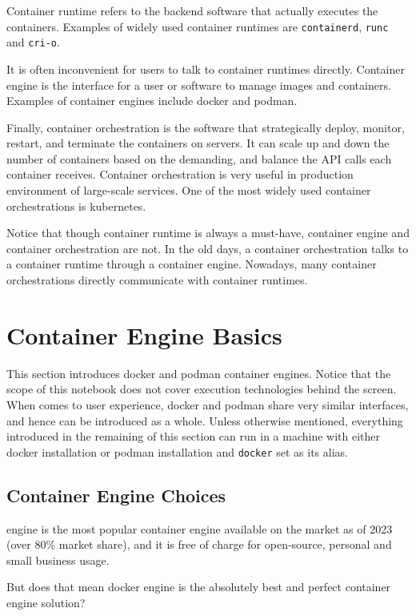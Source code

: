 Container runtime refers to the backend software that actually executes the containers. Examples of widely used container runtimes are \verb|containerd|, \verb|runc| and \verb|cri-o|. 

It is often inconvenient for users to talk to container runtimes directly. Container engine is the interface for a user or software to manage images and containers. Examples of container engines include docker and podman. 

Finally, container orchestration is the software that strategically deploy, monitor, restart, and terminate the containers on servers. It can scale up and down the number of containers based on the demanding, and balance the API calls each container receives. Container orchestration is very useful in production environment of large-scale services. One of the most widely used container orchestrations is kubernetes.

Notice that though container runtime is always a must-have, container engine and container orchestration are not. In the old days, a container orchestration talks to a container runtime through a container engine. Nowadays, many container orchestrations directly communicate with container runtimes.

\section{Container Engine Basics} \label{ch:vac:sec:dc}

This section introduces docker and podman container engines. Notice that the scope of this notebook does not cover execution technologies behind the screen. When comes to user experience, docker and podman share very similar interfaces, and hence can be introduced as a whole. Unless otherwise mentioned, everything introduced in the remaining of this section can run in a machine with either docker installation or podman installation and \verb|docker| set as its alias.

\subsection{Container Engine Choices}

 engine is the most popular container engine available on the market as of 2023 (over $80\%$ market share), and it is free of charge for open-source, personal and small business usage.

But does that mean docker engine is the absolutely best and perfect container engine solution?

